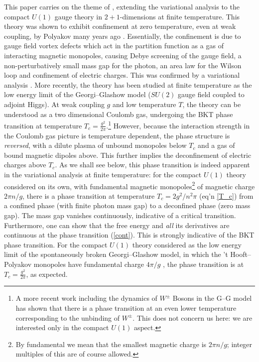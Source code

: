 \documentclass[a4paper,a4paper]{article}
\begin{document}
This paper carries on the theme of \cite{Kogan:2002yr}, 
extending the variational analysis to the compact $U(1)$ gauge theory in $2+1$-dimensions at finite temperature.
This theory was shown to exhibit confinement at zero temperature, even at weak coupling, 
by Polyakov many years ago \cite{Polyakov:1977fu}. Essentially, the confinement is due to gauge field vortex defects 
which act in the partition function as a gas of interacting magnetic monopoles, causing Debye screening of the gauge field, 
a non-perturbatively small mass gap for the photon, an area law for the Wilson loop
and confinement of electric charges.
This was confirmed by a variational analysis \cite{Kogan:1995vb, Kovner:1998eg}. 
More recently, the theory has been studied at finite temperature \cite{Svetitsky:1982gs, Agasian:1998wv}
as the low energy limit of the Georgi--Glashow model ($SU(2)$ gauge field coupled to adjoint Higgs). 
At weak coupling $g$ and low temperature $T$, the theory can be understood as a two dimensional Coulomb gas,
undergoing the BKT phase transition \cite{Berezinskii:1971,Kosterlitz:1973xp} at temperature $T_c=\frac{g^2}{2\pi}$.\footnote{A more
recent work \cite{Dunne:2000vp} including the dynamics of $W^{\pm}$ Bosons in the G--G model has shown
that there is a phase transition at an even lower temperature corresponding to the unbinding of $W^{\pm}$.
This does not concern us here: we are interested only in the compact $U(1)$ aspect.} 
However, because the interaction strength
in the Coulomb gas picture is temperature dependent, the phase structure is \emph{reversed}, with a dilute plasma
of unbound monopoles below $T_c$ and a gas of bound magnetic dipoles above. This further implies the deconfinement of 
electric charges above $T_c$. As we shall see below, this phase transition is indeed apparent in the variational analysis
at finite temperature: for the compact $U(1)$ theory considered on its own, with fundamental magnetic monopoles\footnote{By
fundamental we mean that the smallest magnetic charge is $2\pi n/g$; integer multiples of this are of course allowed.}
of magnetic charge $2\pi n/g$, there is a phase transition at temperature $T_c = 2g^2/n^2\pi$ (eq'n \ref{T_c}) from a
confined phase (with finite photon mass gap) to a deconfined phase (zero mass gap). The mass gap vanishes continuously,
indicative of a critical transition. Furthermore, one can show that the free energy and \emph{all} its derivatives
are continuous at the phase transition (\ref{cont}). 
This is strongly indicative of the BKT phase transition. For the compact $U(1)$
theory considered as the low energy limit of the spontaneously broken Georgi--Glashow model, in which the 't Hooft--Polyakov
monopoles have fundamental charge $4\pi/g$ \cite{Kovner:1992fm}, the phase transition is at $T_c=\frac{g^2}{2\pi}$, as expected.
\end{document}
